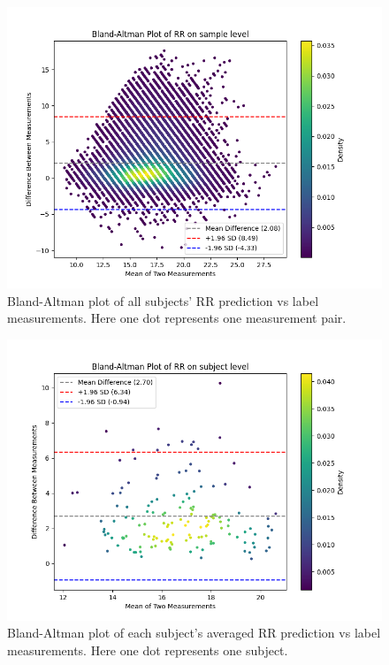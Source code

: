 \documentclass{article}
\begin{document}
\begin{figure}[H]
\centering
\includegraphics[width=\textwidth]{./Fig/Bland_Altman_Plot_RR_on_sample_level.png}
\caption{Bland-Altman plot of all subjects' RR prediction vs label measurements. Here one dot represents one measurement pair.}
\label{fig:image1}
\end{figure}

\begin{figure}[H]
\centering
\includegraphics[width=\textwidth]{./Fig/Bland_Altman_Plot_RR_on_subject_level.png}
\caption{Bland-Altman plot of each subject's averaged RR prediction vs label measurements. Here one dot represents one subject.}
\label{fig:image1}
\end{figure}
\end{document}
